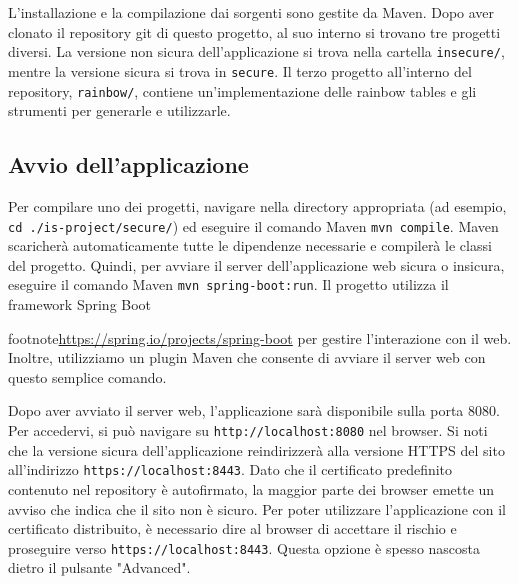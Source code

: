 \documentclass[conference,onecolumn,a4paper]{IEEEtran}
\begin{document}
L'installazione e la compilazione dai sorgenti sono gestite da Maven. Dopo aver clonato il repository git di questo progetto, al suo interno si trovano tre progetti diversi. La versione non sicura dell'applicazione si trova nella cartella \verb|insecure/|, mentre la versione sicura si trova in \verb|secure|. Il terzo progetto all'interno del repository, \verb|rainbow/|, contiene un'implementazione delle rainbow tables e gli strumenti per generarle e utilizzarle.

\subsection{Avvio dell'applicazione}

Per compilare uno dei progetti, navigare nella directory appropriata (ad esempio, \verb|cd ./is-project/secure/|) ed eseguire il comando Maven \verb|mvn compile|. Maven scaricherà automaticamente tutte le dipendenze necessarie e compilerà le classi del progetto. Quindi, per avviare il server dell'applicazione web sicura o insicura, eseguire il comando Maven \verb|mvn spring-boot:run|. Il progetto utilizza il framework Spring Boot {footnote{\url{https://spring.io/projects/spring-boot}} per gestire l'interazione con il web. Inoltre, utilizziamo un plugin Maven che consente di avviare il server web con questo semplice comando.

Dopo aver avviato il server web, l'applicazione sarà disponibile sulla porta 8080. Per accedervi, si può navigare su \verb|http://localhost:8080| nel browser. Si noti che la versione sicura dell'applicazione reindirizzerà alla versione HTTPS del sito all'indirizzo \verb|https://localhost:8443|. Dato che il certificato predefinito contenuto nel repository è autofirmato, la maggior parte dei browser emette un avviso che indica che il sito non è sicuro. Per poter utilizzare l'applicazione con il certificato distribuito, è necessario dire al browser di accettare il rischio e proseguire verso \verb|https://localhost:8443|. Questa opzione è spesso nascosta dietro il pulsante "Advanced".

}
\end{document}
